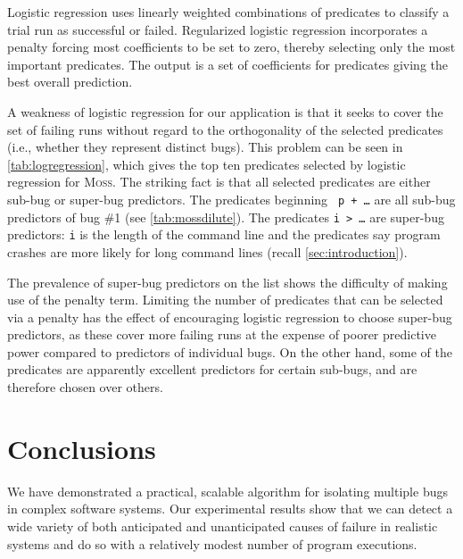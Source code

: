 \documentclass[draft]{sig-alternate}
\newcommand{\moss}{\textsc{Moss}\xspace}
\newcommand{\issue}[2][]{}
\begin{document}
Logistic regression uses linearly weighted
combinations of predicates to classify a trial run as successful or
failed.  Regularized logistic regression incorporates a penalty
forcing most coefficients to be set to zero, thereby
selecting only the most important predicates.  The output is a set of
coefficients for predicates giving the best overall prediction.

A weakness of logistic regression for our application is that it seeks
to cover the set of failing runs without regard to the orthogonality
of the selected predicates (i.e., whether they represent distinct
bugs).  This problem can be seen in \autoref{tab:logregression},
which gives the top ten predicates selected by logistic regression
for \moss.  The striking fact is that all selected predicates are
either sub-bug or super-bug predictors.  The predicates beginning {\tt
p + \ldots} are all sub-bug predictors of bug \#1 (see
\autoref{tab:mossdilute}).  The predicates {\tt i > \ldots} are
super-bug predictors: {\tt i} is the length of the command line and
the predicates say program crashes are more likely for long command
lines (recall \autoref{sec:introduction}).

The prevalence of super-bug predictors on the list shows the
difficulty of making use of the penalty term.  Limiting the number of
predicates that can be selected via a penalty has the effect of
encouraging logistic regression to choose super-bug predictors, as
these cover more failing runs at the expense of poorer predictive
power compared to predictors of individual bugs.  On the other hand,
some of the predicates are apparently excellent predictors for certain
sub-bugs, and are therefore chosen over others.

\issue[Alice]{I changed the justification for why sub-bug predictors
  are selected.  We don't relax the regularization penalty during log
  reg training, but I think sub-bug predictors are selected because
  they are really good predictors for certain subsets of failed runs.
  [text modified]}

\section{Conclusions}
\label{sec:conclusions}

We have demonstrated a practical, scalable algorithm for isolating multiple bugs
in complex software systems.  Our experimental results show that we can
detect a wide variety of both anticipated and unanticipated causes of failure
in realistic systems and do so with a relatively modest number of program
executions.

{\small

}
\end{document}
